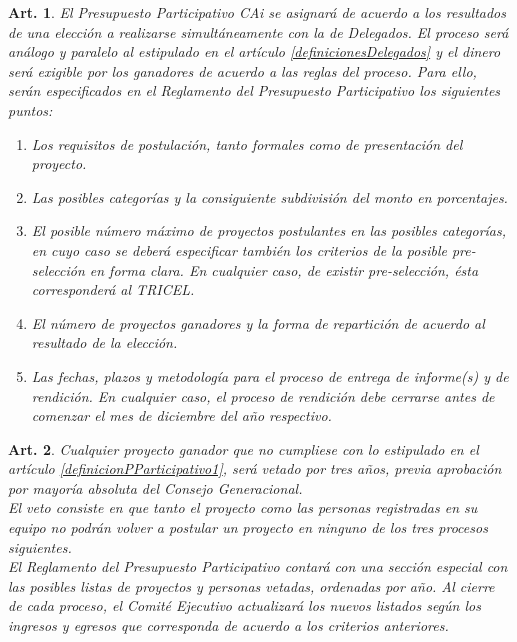 \documentclass[letterpaper,11pt]{article}
\theoremstyle{plain}
\newtheorem{art}{Art.} %
\newcommand{\aref}[1]{\hyperref[#1]{\ref*{#1}}}
\begin{document}
			\begin{art}\label{definicionPParticipativo2}
				El Presupuesto Participativo CAi se asignará de acuerdo a los resultados de una elección a realizarse simultáneamente con la de Delegados. El proceso será análogo y paralelo al estipulado en el artículo \aref{definicionesDelegados} y el dinero será exigible por los ganadores de acuerdo a las reglas del proceso. Para ello, serán especificados en el Reglamento del Presupuesto Participativo los siguientes puntos:
				\begin{enumerate}
					\item Los requisitos de postulación, tanto formales como de presentación del proyecto.
					\item Las posibles categorías y la consiguiente subdivisión del monto en porcentajes.
					\item El posible número máximo de proyectos postulantes en las posibles categorías, en cuyo caso se deberá especificar también los criterios de la posible pre-selección en forma clara. En cualquier caso, de existir pre-selección, ésta corresponderá al TRICEL.
					\item El número de proyectos ganadores y la forma de repartición de acuerdo al resultado de la elección.
					\item Las fechas, plazos y metodología para el proceso de entrega de informe(s) y de rendición. En cualquier caso, el proceso de rendición debe cerrarse antes de comenzar el mes de diciembre del año respectivo.
				\end{enumerate}
			\end{art}

			\begin{art}\label{sancionesPParticipativo}
				Cualquier proyecto ganador que no cumpliese con lo estipulado en el artículo \aref{definicionPParticipativo1}, será vetado por tres años, previa aprobación por mayoría absoluta del Consejo Generacional.
				\\
				El veto consiste en que tanto el proyecto como las personas registradas en su equipo no podrán volver a postular un proyecto en ninguno de los tres procesos siguientes.
				\\
				El Reglamento del Presupuesto Participativo contará con una sección especial con las posibles listas de proyectos y personas vetadas, ordenadas por año. Al cierre de cada proceso, el Comité Ejecutivo actualizará los nuevos listados según los ingresos y egresos que corresponda de acuerdo a los criterios anteriores.
			\end{art}
\end{document}
